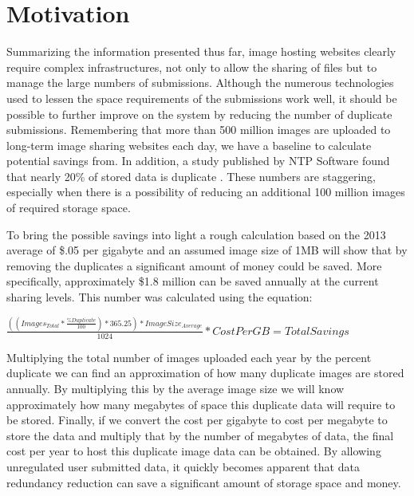 \section{Motivation} \label{sec:motivation}
Summarizing the information presented thus far, image hosting websites clearly require complex infrastructures, not only to allow the sharing of files but to manage the large numbers of submissions. Although the numerous technologies used to lessen the space requirements of the submissions work well, it should be possible to further improve on the system by reducing the number of duplicate submissions. Remembering that more than 500 million images are uploaded to long-term image sharing websites each day, we have a baseline to calculate potential savings from. In addition, a study published by NTP Software found that nearly 20\% of stored data is duplicate \cite{ntps:staledata}. These numbers are staggering, especially when there is a possibility of reducing an additional 100 million images of required storage space.

To bring the possible savings into light a rough calculation based on the 2013 average of \$.05 per gigabyte and an assumed image size of 1MB will show that by removing the duplicates a significant amount of money could be saved. More specifically, approximately \$1.8 million can be saved annually at the current sharing levels. This number was calculated using the equation:
\begin{center}
$\frac{((Images_{Total}*\frac{\%Duplicate}{100})*365.25)*ImageSize_{Average}}{1024}*CostPerGB=TotalSavings$
\end{center}
Multiplying the total number of images uploaded each year by the percent duplicate we can find an approximation of how many duplicate images are stored annually. By multiplying this by the average image size we will know approximately how many megabytes of space this duplicate data will require to be stored. Finally, if we convert the cost per gigabyte to cost per megabyte to store the data and multiply that by the number of megabytes of data, the final cost per year to host this duplicate image data can be obtained. By allowing unregulated user submitted data, it quickly becomes apparent that data redundancy reduction can save a significant amount of storage space and money.

